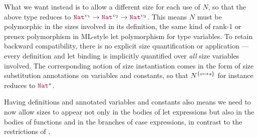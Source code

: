 What we want instead is to allow a different size for each use of $N$,
so that the above type reduces to $\Nat^{\upsilon_1} \rightarrow \Nat^{\upsilon_2} \rightarrow \Nat^{\upsilon_3}$.
This means $N$ must be polymorphic in the sizes involved in its definition,
the same kind of rank-1 or prenex polymorphism in ML-style let polymorphism for type variables.
To retain backward compatibility, there is no explicit size quantification or application ---
every definition and let binding is implicitly quantified over \emph{all} size variables involved.
The corresponding notion of size instantiation comes in the form of size substitution annotations on variables and constants, so that $N^{\{\upsilon \mapsto s\}}$ for instance reduces to $\Nat^s$.

Having definitions and annotated variables and constants also means we need to now allow sizes to appear
not only in the bodies of let expressions but also in the bodies of functions and in the branches of case expressions,
in contrast to the restrictions of \CIChatminus.

\iffalse
\paragraph*{} Recall that the inference algorithm will return a size constraint set.
To handle inference of global declarations, after the size inference of one declaration,
we now have two options:
pass the resulting constraints along to inference of subsequent declarations,
or ``solve'' the constraints by reassigning size variables with sizes that satisfy those constraints.
Global definitions in Coq are independent of one another in terms of type checking,
so we choose the second option for its modularity:
constraints derived from previous definitions should not interfere with the size inference of the current definition.
However, solving constraints introduces a nontrivial overhead,
so we stick with the first option for local definitions.

Unfortunately, even when only solving constraints for global declarations,
our implementation of the size inference algorithm in the Coq codebase takes a rather significant performance hit.
This is in part due to the proliferation of sizes in which the definitions are polymorphic,
as the worst-case time complexity of solving is at least quadratic in the number of size variables,
and every usage of each definition requires fresh size variables for it.
We analyze the performance of our implementation and discuss possible solutions in \autoref{sec:impl}.
\fi

